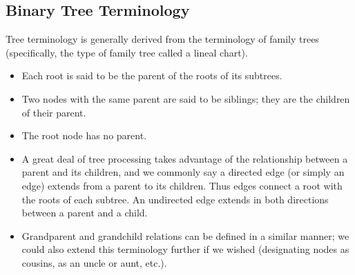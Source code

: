 \documentclass{report}
\begin{document}
    \subsection{Binary Tree Terminology}
    \bigbreak \noindent 
    Tree terminology is generally derived from the terminology of family trees (specifically, the type of family tree called a lineal chart).
    \begin{itemize}
        \item Each root is said to be the parent of the roots of its subtrees.
        \item Two nodes with the same parent are said to be siblings; they are the children of their parent.
        \item The root node has no parent.
        \item A great deal of tree processing takes advantage of the relationship between a parent and its children, and we commonly say a directed edge (or simply an edge) extends from a parent to its children. Thus edges connect a root with the roots of each subtree. An undirected edge extends in both directions between a parent and a child.
        \item Grandparent and grandchild relations can be defined in a similar manner; we could also extend this terminology further if we wished (designating nodes as cousins, as an uncle or aunt, etc.).
    \end{itemize}
    \bigbreak \noindent 
\end{document}
